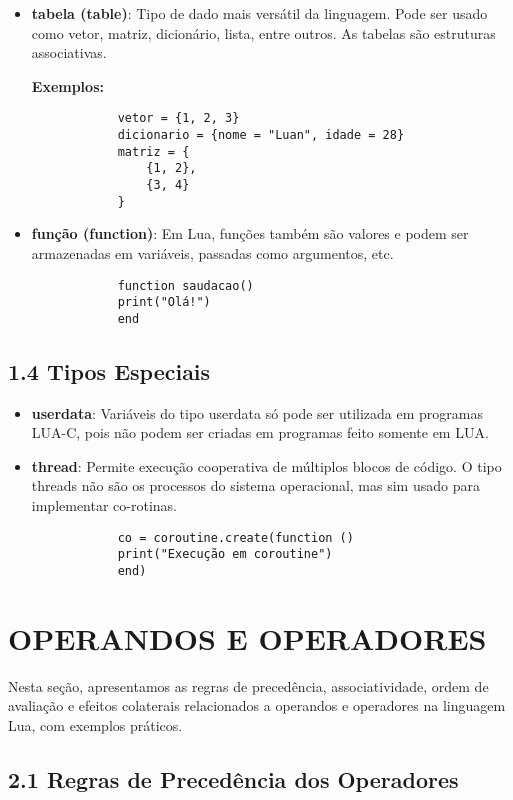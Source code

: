 \documentclass[12pt,a4paper]{article}
\begin{document}
	\begin{itemize}
		\item \textbf{tabela (table)}: Tipo de dado mais versátil da linguagem. Pode ser usado como vetor, matriz, dicionário, lista, entre outros. As tabelas são estruturas associativas.
		
		\textbf{Exemplos:}
		\begin{verbatim}
			vetor = {1, 2, 3}
			dicionario = {nome = "Luan", idade = 28}
			matriz = {
				{1, 2},
				{3, 4}
			}
		\end{verbatim}
		
		\item \textbf{função (function)}: Em Lua, funções também são valores e podem ser armazenadas em variáveis, passadas como argumentos, etc.
		
		\begin{verbatim}
			function saudacao()
			print("Olá!")
			end
		\end{verbatim}
	\end{itemize}
	
	\subsection*{1.4 Tipos Especiais}
	
	\begin{itemize}
		\item \textbf{userdata}: Variáveis do tipo userdata só pode ser utilizada em programas LUA-C, pois não podem ser criadas em programas feito somente em LUA.
		
		\item \textbf{thread}: Permite execução cooperativa de múltiplos blocos de código. O tipo threads não são os processos do sistema operacional, mas sim usado para implementar co-rotinas.
		
		\begin{verbatim}
			co = coroutine.create(function ()
			print("Execução em coroutine")
			end)
		\end{verbatim}
	\end{itemize}
	\section{OPERANDOS E OPERADORES}
	Nesta seção, apresentamos as regras de precedência, associatividade, ordem de avaliação e efeitos colaterais relacionados a operandos e operadores na linguagem Lua, com exemplos práticos.
	
	\subsection*{2.1 Regras de Precedência dos Operadores}
	
\end{document}
